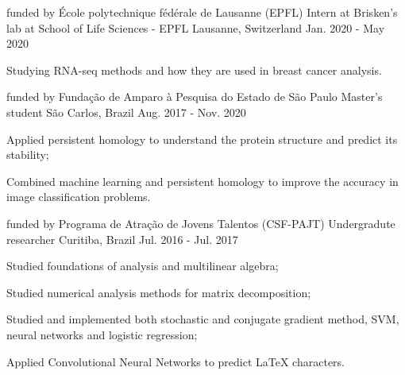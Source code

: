 

\begin{cventries}

  \cventry
    {funded by École polytechnique fédérale de Lausanne (EPFL)}
    {Intern at Brisken's lab at School of Life Sciences - EPFL}
    {Lausanne, Switzerland} 
    {Jan. 2020 - May 2020} 
    {
      \begin{cvitems} 
        \item {Studying RNA-seq methods and how they are used 
              in breast cancer analysis.}
      \end{cvitems} 
    }
  \cventry
    {funded by Fundação de Amparo à Pesquisa do Estado de São Paulo} %
    {Master's student} %
    {São Carlos, Brazil} %
    {Aug. 2017 - Nov. 2020} %
    {
      \begin{cvitems} %
        \item {Applied persistent homology to understand the protein structure
        and predict its stability;}
        \item {Combined machine learning and persistent homology to improve
        the accuracy in image classification problems.}
      \end{cvitems}
    }

\cventry
  {funded by Programa de Atração de Jovens Talentos (CSF-PAJT)} %
  {Undergradute researcher} %
  {Curitiba, Brazil} %
  {Jul. 2016 - Jul. 2017} %
  {
    \begin{cvitems} %
      \item {Studied foundations of analysis and multilinear algebra;}
      \item {Studied numerical analysis methods for matrix decomposition;}
      \item {Studied and implemented both stochastic and conjugate gradient
      method, SVM, neural networks and logistic regression;}
      \item {Applied Convolutional Neural Networks to predict LaTeX characters.}
    \end{cvitems}
  }

\end{cventries}
